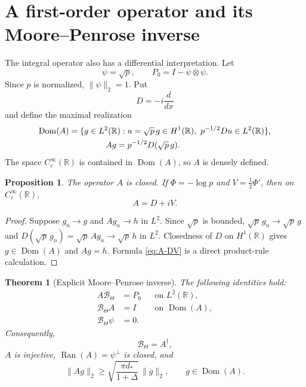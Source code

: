 \documentclass[11pt,reqno]{amsart}
\numberwithin{equation}{section}
\newtheorem{theorem}{Theorem}[section]
\newtheorem{proposition}[proposition]{Proposition}
\newcommand{\R}{\mathbb R}
\newcommand{\1}{\mathbf 1}
\newcommand{\BTheta}{\mathcal B_{\Theta}}
\newcommand{\Dom}{\operatorname{Dom}}
\newcommand{\Ran}{\operatorname{Ran}}
\begin{document}
\section{A first-order operator and its Moore--Penrose inverse}

The integral operator also has a differential interpretation.  Let
\begin{equation}\label{eq:psi-P0}
 \psi=\sqrt p,
 \qquad
 P_0=I-\psi\otimes\psi.
\end{equation}
Since $p$ is normalized, $\|\psi\|_2=1$.  Put
\begin{equation}\label{eq:D-def}
 D=-i\frac{d}{dx}
\end{equation}
and define the maximal realization
\begin{align}
 \Dom(A)=\{g\in L^2(\R):{}&u=\sqrt p\,g\in H^1(\R),
 \ p^{-1/2}Du\in L^2(\R)\},\notag\\
 Ag={}&p^{-1/2}D(\sqrt p\,g).
 \label{eq:A-domain}
\end{align}
The space $C_c^\infty(\R)$ is contained in $\Dom(A)$, so $A$ is densely
defined.

\begin{proposition}\label{prop:A-closed}
The operator $A$ is closed.  If $\Phi=-\log p$ and
$V=\tfrac12\Phi'$, then on $C_c^\infty(\R)$,
\begin{equation}\label{eq:A-DV}
 A=D+iV.
\end{equation}
\end{proposition}

\begin{proof}
Suppose $g_n\to g$ and $Ag_n\to h$ in $L^2$.  Since $\sqrt p$ is bounded,
$\sqrt p\,g_n\to\sqrt p\,g$ and
$D(\sqrt p\,g_n)=\sqrt p\,Ag_n\to\sqrt p\,h$ in $L^2$.  Closedness of
$D$ on $H^1(\R)$ gives $g\in\Dom(A)$ and $Ag=h$.  Formula
\eqref{eq:A-DV} is a direct product-rule calculation.
\end{proof}

\begin{theorem}[Explicit Moore--Penrose inverse]\label{thm:MP-inverse}
The following identities hold:
\begin{align}
 A\BTheta&=P_0 &&\text{on }L^2(\R),
 \label{eq:AB-P}\\
 \BTheta A&=I &&\text{on }\Dom(A),
 \label{eq:BA-I}\\
 \BTheta\psi&=0.\label{eq:Bpsi-zero}
\end{align}
Consequently,
\begin{equation}\label{eq:B-MP}
 \boxed{\BTheta=A^\dagger,}
\end{equation}
$A$ is injective, $\Ran(A)=\psi^\perp$ is closed, and
\begin{equation}\label{eq:A-lower}
 \boxed{
 \|Ag\|_2\geq
 \sqrt{\frac{\pi d_*}{1+\Delta}}\,\|g\|_2,
 \qquad g\in\Dom(A).}
\end{equation}
\end{theorem}
\end{document}
